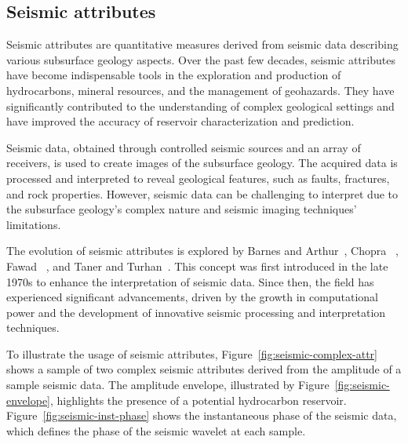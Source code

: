 \subsection{Seismic attributes}
\label{subsec:seismic-attributes}

Seismic attributes are quantitative measures derived from seismic data describing various subsurface geology aspects.
Over the past few decades, seismic attributes have become indispensable tools in the exploration and production of hydrocarbons, mineral resources, and the management of geohazards.
They have significantly contributed to the understanding of complex geological settings and have improved the accuracy of reservoir characterization and prediction.

Seismic data, obtained through controlled seismic sources and an array of receivers, is used to create images of the subsurface geology.
The acquired data is processed and interpreted to reveal geological features, such as faults, fractures, and rock properties.
However, seismic data can be challenging to interpret due to the subsurface geology's complex nature and seismic imaging techniques' limitations.

The evolution of seismic attributes is explored by Barnes and Arthur~\cite{barnes2001seismic}, Chopra \etal~\cite{chopra2005seismic}, Fawad \etal~\cite{fawad2020seismic}, and Taner and Turhan~\cite{taner2001seismic}.
This concept was first introduced in the late 1970s to enhance the interpretation of seismic data.
Since then, the field has experienced significant advancements, driven by the growth in computational power and the development of innovative seismic processing and interpretation techniques.

To illustrate the usage of seismic attributes, Figure~\ref{fig:seismic-complex-attr} shows a sample of two complex seismic attributes derived from the amplitude of a sample seismic data.
The amplitude envelope, illustrated by Figure~\ref{fig:seismic-envelope}, highlights the presence of a potential hydrocarbon reservoir.
Figure~\ref{fig:seismic-inst-phase} shows the instantaneous phase of the seismic data, which defines the phase of the seismic wavelet at each sample.

